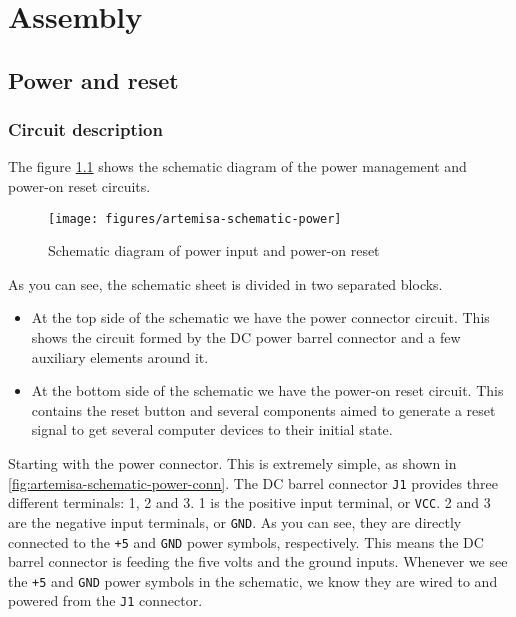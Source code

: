 \chapter{Assembly}

\section{Power and reset}

\subsection{Circuit description}

The figure \ref{fig:artemisa-schematic-power} shows the schematic diagram of the power management and power-on reset circuits.

\begin{figure}[h]
  \centering
  \texttt{[image: figures/artemisa-schematic-power]}
  \caption{Schematic diagram of power input and power-on reset}
  \label{fig:artemisa-schematic-power}
\end{figure}

As you can see, the schematic sheet is divided in two separated blocks.

\begin{itemize}
  \item At the top side of the schematic we have the power connector circuit. This shows the circuit formed by the DC power barrel connector and a few auxiliary elements around it.
  \item At the bottom side of the schematic we have the power-on reset circuit. This contains the reset button and several components aimed to generate a reset signal to get several computer devices to their initial state.
\end{itemize}

Starting with the power connector. This is extremely simple, as shown in \ref{fig:artemisa-schematic-power-conn}. The DC barrel connector {\tt J1} provides three different terminals: 1, 2 and 3. 1 is the positive input terminal, or {\tt VCC}. 2 and 3 are the negative input terminals, or {\tt GND}. As you can see, they are directly connected to the {\tt +5} and {\tt GND} power symbols, respectively. This means the DC barrel connector is feeding the five volts and the ground inputs. Whenever we see the {\tt +5} and {\tt GND} power symbols in the schematic, we know they are wired to and powered from the {\tt J1} connector.


